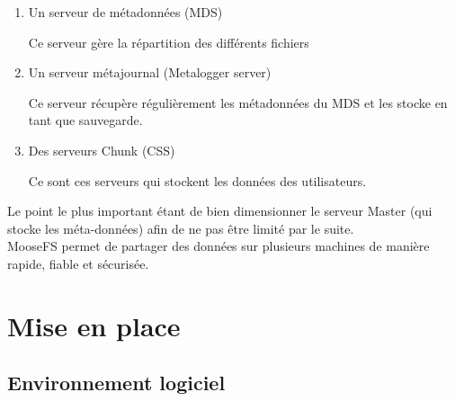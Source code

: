 \documentclass[12pt]{report}
\begin{document}
				\begin{enumerate}
					\item Un serveur de métadonnées (MDS)

					Ce serveur gère la répartition des différents fichiers
					\item Un serveur métajournal (Metalogger server)

					Ce serveur récupère régulièrement les métadonnées du MDS et les stocke en tant que sauvegarde.
					\item Des serveurs Chunk (CSS) %

					Ce sont ces serveurs qui stockent les données des utilisateurs.
				\end{enumerate}
				
				Le point le plus important étant de bien dimensionner le serveur Master (qui stocke les méta-données)
				afin de ne pas être limité par le suite.\\

				MooseFS permet de partager des données sur plusieurs machines de manière rapide, fiable et sécurisée.

		\section{Mise en place}
			\subsection{Environnement logiciel}
\end{document}
